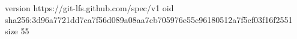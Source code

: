 version https://git-lfs.github.com/spec/v1
oid sha256:3d96a7721dd7ca7f56d089a08aa7cb705976e55c96180512a7f5cf03f16f2551
size 55
